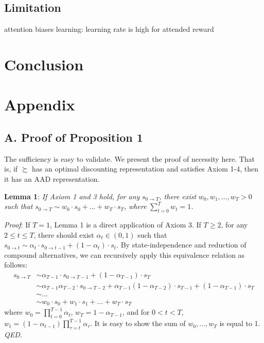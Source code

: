 \documentclass[
  12pt,
]{article}
\begin{document}
\hypertarget{limitation}{%
\subsection{Limitation}\label{limitation}}

attention biases learning: learning rate is high for attended reward

\hypertarget{conclusion}{%
\section{Conclusion}\label{conclusion}}

\renewcommand\refname{Reference}
  

\newpage

\hypertarget{appendix}{%
\section{Appendix}\label{appendix}}

\hypertarget{a.-proof-of-proposition-1}{%
\subsection{A. Proof of Proposition 1}\label{a.-proof-of-proposition-1}}

The sufficiency is easy to validate. We present the proof of necessity
here. That is, if \(\succsim\) has an optimal discounting representation
and satisfies Axiom 1-4, then it has an AAD representation.

\noindent \textbf{Lemma 1}: \emph{If Axiom 1 and 3 hold, for any}
\(s_{0\rightarrow T}\)\emph{, there exist} \(w_0, w_1, …, w_T > 0\)
\emph{such that}
\(s_{0\rightarrow T} \sim w_0 \cdot s_0 + ...+w_T\cdot s_T\)\emph{,
where} \(\sum_{t=0}^T w_t=1\)\emph{.}

\noindent \emph{Proof}: If \(T=1\), Lemma 1 is a direct application of
Axiom 3. If \(T\geq 2\), for any \(2\leq t\leq T\), there should exist
\(\alpha_t\in(0,1)\) such that
\(s_{0\rightarrow t}\sim \alpha_t\cdot s_{0\rightarrow t-1}+(1-\alpha_t)\cdot s_{t}\).
By state-independence and reduction of compound alternatives, we can
recursively apply this equivalence relation as follows:\[
\begin{aligned}
s_{0\rightarrow T} &\sim \alpha_{T-1}\cdot s_{0\rightarrow T-1} + (1-\alpha_{T-1})\cdot s_T \\
&\sim  \alpha_{T-1}\alpha_{T-2}\cdot s_{0\rightarrow T-2} + \alpha_{T-1}(1-\alpha_{T-2})\cdot s_{T-1} + (1-\alpha_{T-1})\cdot s_T \\
& \sim ...\\
& \sim w_0 \cdot s_0 + w_1\cdot s_1 +... +w_T\cdot s_T
\end{aligned}
\]where \(w_0=\prod_{t=0}^{T-1}\alpha_t\), \(w_T = 1-\alpha_{T-1}\), and
for \(0<t<T\),
\(w_t=(1-\alpha_{t-1})\prod_{\tau=t}^{T-1}\alpha_{\tau}\). It is easy to
show the sum of \(w_0,…,w_T\) is equal to 1. \emph{QED}.
\end{document}
